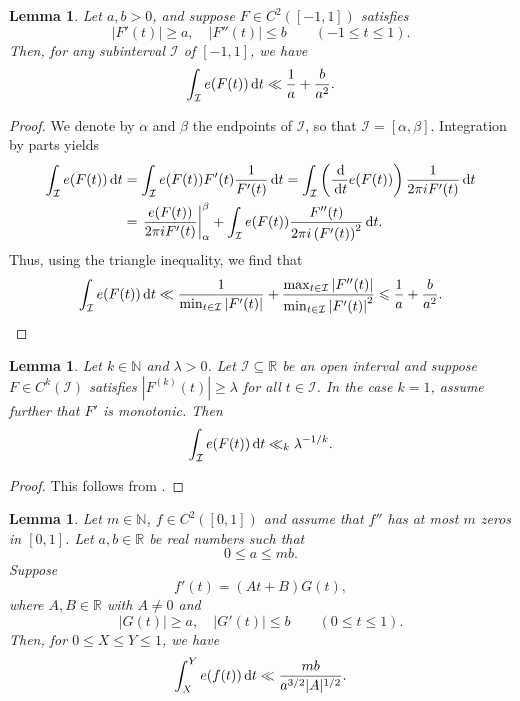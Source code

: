 \documentclass[12pt, reqno]{amsart}
\newtheorem{lemma}[thm]{Lemma}
\theoremstyle{definition}
\theoremstyle{remark}
\numberwithin{equation}{section}
\def\lam{{\lambda}} \def\Lam{{\Lambda}} \def\Lamtil{{\widetilde \Lambda}}
\def\le{\leqslant} \def\ge{\geqslant}
\def\leq{\leqslant}
\def\d{{\,{\rm d}}}
\def \bN {\mathbb N}
\def \bR {\mathbb R}
\def \cI {\mathcal I}
\begin{document}
\begin{lemma} \label{lem_ub_nozero_fv}
Let $a,b > 0$, and suppose $F \in C^2([-1,1])$ satisfies 
\[
|F'(t)| \ge a, \quad |F''(t)| \le b \qquad (-1 \le t \le 1).
\]
Then, for any subinterval $\cI$ of $[-1,1]$, we have
\[
\int_\cI e(F(t)) \d t \ll \frac1a + \frac{b}{a^2}.
\]
\end{lemma}

\begin{proof}
We denote by $\alpha$ and $\beta$ the endpoints of $\cI$, so that $\cI=[\alpha,\beta]$. Integration by parts yields
\[
\begin{aligned}
\int_\cI e(F(t)) \d t &=\int_\cI e(F(t))F'(t)\frac{1}{F'(t)} 
\d t=\int_\cI 
\left(\frac{\d}{\d t} e(F(t)) \right)
\frac{1}{2\pi i F'(t)} \d t\\
&=\left.\frac{e(F(t))}{2\pi i F'(t)}\right|_{\alpha}^{\beta}
+ \int_\cI e(F(t))\frac{F''(t)}{2\pi i \left(F'(t)\right)^2} \d t.
\end{aligned}
\]
Thus, using the triangle inequality, we find that
\[
\int_\cI e(F(t)) \d t \ll \frac{1}{\min_{t\in\cI}\left|F'(t)\right|}
+
\frac{\max_{t\in\cI}\left|F''(t)\right|}{ \min_{t\in\cI}\left|F'(t)\right|^2}\leq \frac1a + \frac{b}{a^2}.
\]
\end{proof}

\begin{lemma} \label{lem_ub_nozero}
Let $k \in \bN$ and $\lam > 0$. Let $\cI \subseteq \bR$ be an open interval and suppose $F \in C^k(\cI)$ satisfies $|F^{(k)}(t)| \ge \lam$ for all $t\in \cI$. In the case $k = 1$, assume further that $F'$ is monotonic. Then
\[
\int_\cI e(F(t)) \d t \ll_k \lam^{-1/k}.
\]
\end{lemma}

\begin{proof}
This follows from \cite[Chapter VIII, \S 1, Proposition 2]{Ste1993}.
\end{proof}

\begin{lemma} \label{ExpInt} Let $m\in\mathbb{N}$,  $f\in C^2([0,1])$ and assume that $f''$ has at most $m$ zeros in $[0,1]$. Let  $a,b\in\mathbb{R}$ be real numbers such that
\begin{equation} \label{a_less_than_b}
0\leq a\leq mb.
\end{equation}
Suppose
\[
f'(t) = (A t + B) G(t),
\]
where $A, B \in \bR$ with $A \ne 0$  and 
\[
|G(t)| \ge a, \quad |G'(t)| \le b \qquad (0 \le t \le 1).
\]
Then, for $0 \le X \le Y \le 1$, we have 
\begin{equation} \label{lem_ub_zero_result}
\int_X^Y e(f(t)) \d t \ll \frac{m b}{a^{3/2} |A|^{1/2}}.
\end{equation}
\end{lemma}
\end{document}
